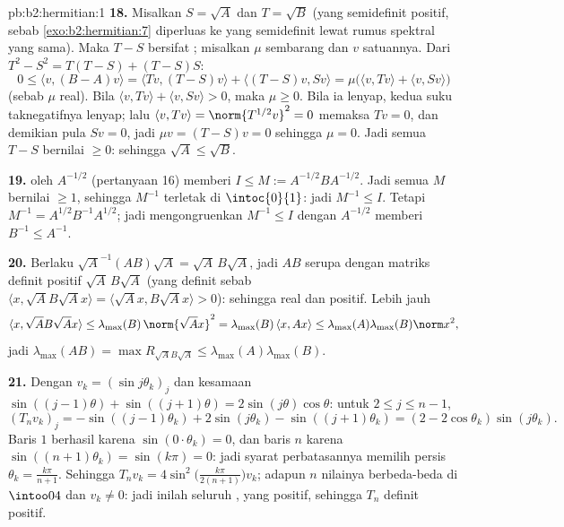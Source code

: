 \begin{solution}{pb:b2:hermitian:1}
\textbf{18.} Misalkan $S = \sqrt A$ dan $T = \sqrt B$ (yang 
semidefinit positif, sebab \cref{exo:b2:hermitian:7} diperluas ke yang
semidefinit lewat rumus spektral yang sama). Maka $T - S$ bersifat
; misalkan $\mu$ sembarang  dan $v$  satuannya.
Dari $T^2 - S^2 = T(T - S) + (T - S)S$:
\[
0 \leq \langle v, (B - A)v\rangle
= \langle Tv, (T-S)v\rangle + \langle (T-S)v, Sv\rangle
= \mu\bigl(\langle v, Tv\rangle + \langle v,
Sv\rangle\bigr)
\]
(sebab $\mu$ real). Bila $\langle v, Tv\rangle + \langle v,
Sv\rangle > 0$, maka $\mu \geq 0$. Bila ia lenyap, kedua suku
taknegatifnya lenyap; lalu $\langle v, Tv\rangle =
\norm{T^{1/2}v}^2 = 0$ memaksa $Tv = 0$, dan demikian pula $Sv = 0$, jadi
$\mu v = (T - S)v = 0$ sehingga $\mu = 0$. Jadi semua  $T -
S$ bernilai $\geq 0$: sehingga $\sqrt A \leq \sqrt B$.

\textbf{19.}  oleh $A^{-1/2}$ (pertanyaan 16) memberi $I \leq M
:= A^{-1/2}BA^{-1/2}$. Jadi semua  $M$ bernilai $\geq 1$,
sehingga  $M^{-1}$ terletak di $\intoc{0}{1}$: jadi $M^{-1} \leq I$.
Tetapi $M^{-1} = A^{1/2}B^{-1}A^{1/2}$; jadi mengongruenkan $M^{-1} \leq
I$ dengan $A^{-1/2}$ memberi $B^{-1} \leq A^{-1}$.

\textbf{20.} Berlaku $\sqrt A^{-1}(AB)\sqrt A = \sqrt A\,B\sqrt A$, jadi
$AB$ serupa dengan matriks  definit positif $\sqrt
A\,B\sqrt A$ (yang definit sebab $\langle x, \sqrt AB\sqrt Ax\rangle =
\langle \sqrt Ax, B\sqrt Ax\rangle > 0$): sehingga 
real dan positif. Lebih jauh
\[
\langle x, \sqrt AB\sqrt Ax\rangle
\leq \lambda_{\max}(B)\,\norm{\sqrt Ax}^2
= \lambda_{\max}(B)\,\langle x, Ax\rangle
\leq \lambda_{\max}(A)\lambda_{\max}(B)\norm x^2 ,
\]
jadi $\lambda_{\max}(AB) = \max R_{\sqrt AB\sqrt A} \leq
\lambda_{\max}(A)\lambda_{\max}(B)$.

\textbf{21.} Dengan $v_k = (\sin j\theta_k)_j$ dan kesamaan
$\sin((j-1)\theta) + \sin((j+1)\theta) =
2\sin(j\theta)\cos\theta$: untuk $2 \leq j \leq n-1$,
\[
(T_nv_k)_j = -\sin((j{-}1)\theta_k) + 2\sin(j\theta_k) -
\sin((j{+}1)\theta_k)
= (2 - 2\cos\theta_k)\sin(j\theta_k) .
\]
Baris $1$ berhasil karena $\sin(0\cdot\theta_k) = 0$, dan baris $n$
karena $\sin((n+1)\theta_k) = \sin(k\pi) = 0$: jadi syarat
perbatasannya memilih persis $\theta_k = \frac{k\pi}{n+1}$. Sehingga
$T_nv_k = 4\sin^2\bigl(\frac{k\pi}{2(n+1)}\bigr)v_k$; adapun $n$
nilainya berbeda-beda di $\intoo04$ dan $v_k \neq 0$: jadi inilah
seluruh , yang positif, sehingga $T_n$ definit positif.


\end{solution}
